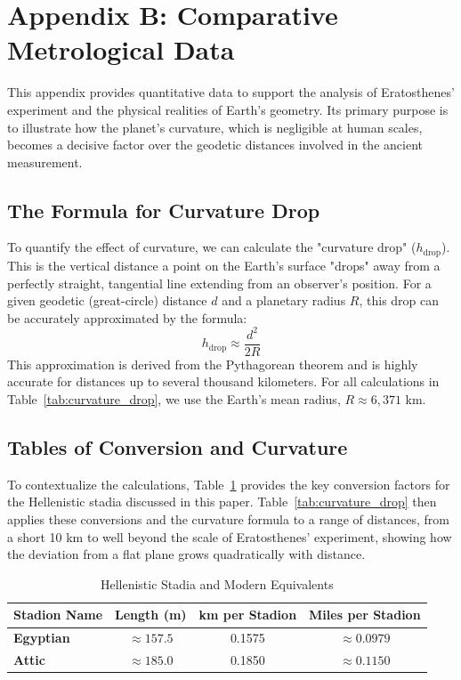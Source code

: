 \documentclass[11pt]{article}
\begin{document}
\section*{Appendix B: Comparative Metrological Data}

This appendix provides quantitative data to support the analysis of Eratosthenes' experiment and the physical realities of Earth's geometry. Its primary purpose is to illustrate how the planet's curvature, which is negligible at human scales, becomes a decisive factor over the geodetic distances involved in the ancient measurement.

\subsection*{The Formula for Curvature Drop}

To quantify the effect of curvature, we can calculate the "curvature drop" ($h_{\text{drop}}$). This is the vertical distance a point on the Earth's surface "drops" away from a perfectly straight, tangential line extending from an observer's position. For a given geodetic (great-circle) distance $d$ and a planetary radius $R$, this drop can be accurately approximated by the formula:
\[
h_{\text{drop}} \approx \frac{d^2}{2R}
\]
This approximation is derived from the Pythagorean theorem and is highly accurate for distances up to several thousand kilometers. For all calculations in Table~\ref{tab:curvature_drop}, we use the Earth's mean radius, $R \approx 6,371$ km.

\subsection*{Tables of Conversion and Curvature}

To contextualize the calculations, Table~\ref{tab:stadia_conversion} provides the key conversion factors for the Hellenistic stadia discussed in this paper. Table~\ref{tab:curvature_drop} then applies these conversions and the curvature formula to a range of distances, from a short 10 km to well beyond the scale of Eratosthenes' experiment, showing how the deviation from a flat plane grows quadratically with distance.

\begin{table}[htbp]
\centering
\caption{Hellenistic Stadia and Modern Equivalents}
\label{tab:stadia_conversion}
\small
\begin{tabular}{@{}lccc@{}}
\toprule
\textbf{Stadion Name} & \textbf{Length (m)} & \textbf{km per Stadion} & \textbf{Miles per Stadion} \\
\midrule
\textbf{Egyptian} & $\approx 157.5$ & 0.1575 & $\approx 0.0979$ \\
\textbf{Attic}    & $\approx 185.0$ & 0.1850 & $\approx 0.1150$ \\
\bottomrule
\end{tabular}
\end{table}
\end{document}
